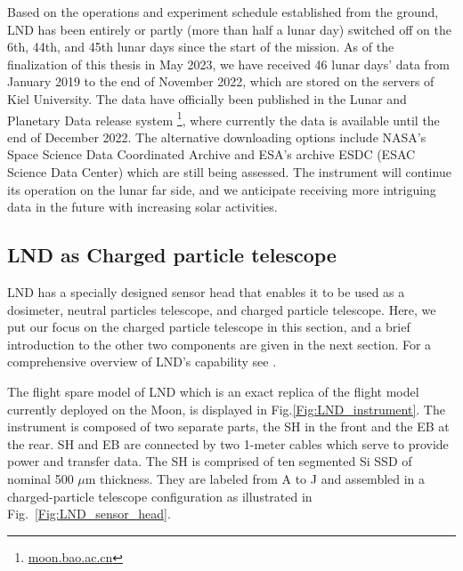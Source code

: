 Based on the operations and experiment schedule established from the ground, \ac{LND} has been entirely or partly (more than half a lunar day) switched off on the 6th, 44th, and 45th lunar days since the start of the mission. As of the finalization of this thesis in May 2023, we have received 46 lunar days' data from January 2019 to the end of November 2022, which are stored on the servers of Kiel University. The data have officially been published in the Lunar and Planetary Data release system \footnote{\url{moon.bao.ac.cn}}, where currently the data is available until the end of December 2022. 
The alternative downloading options include \ac{NASA}'s Space Science Data Coordinated Archive and \ac{ESA}'s archive ESDC (ESAC Science Data Center) which are still being assessed. The instrument will continue its operation on the lunar far side, and we anticipate receiving more intriguing data in the future with increasing solar activities.



\subsection*{LND as Charged particle telescope}

\ac{LND} has a specially designed sensor head that enables it to be used as a dosimeter, neutral particles telescope, and charged particle telescope. Here, we put our focus on the charged particle telescope in this section, and a brief introduction to the other two components are given in the next section. For a comprehensive overview of \ac{LND}'s capability see \citet{Wimmer-2020-LND}.

The flight spare model of \ac{LND} which is an exact replica of the flight model currently deployed on the Moon, is displayed in Fig.\ref{Fig:LND_instrument}. The instrument is composed of two separate parts, the \acl{SH} in the front and the \acl{EB} at the rear. \ac{SH} and \ac{EB} are connected by two 1-meter cables which serve to provide power and transfer data. 
The \ac{SH} is comprised of ten segmented Si \acs{SSD} of nominal 500 $\mu$m thickness. They are labeled from A to J and assembled in a charged-particle telescope configuration as illustrated in Fig.~\ref{Fig:LND_sensor_head}.

